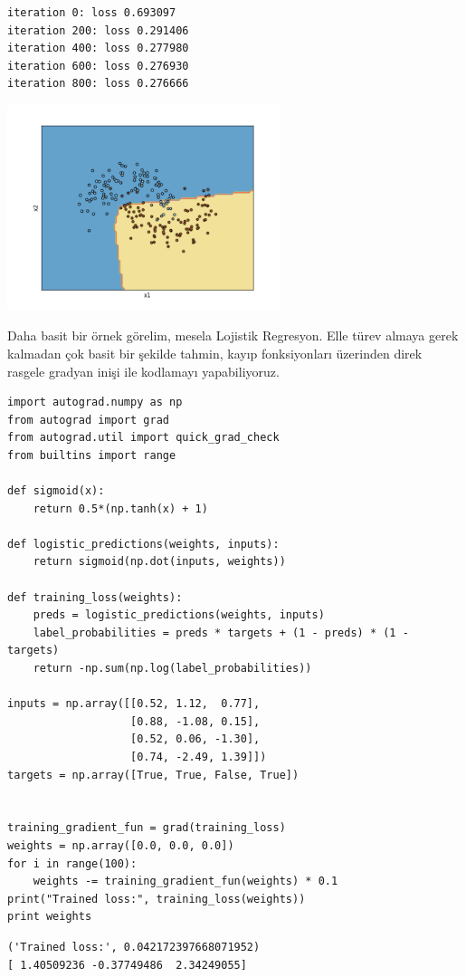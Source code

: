 \documentclass[12pt,fleqn]{article}\usepackage{../../common}
\begin{document}
\begin{verbatim}
iteration 0: loss 0.693097
iteration 200: loss 0.291406
iteration 400: loss 0.277980
iteration 600: loss 0.276930
iteration 800: loss 0.276666
\end{verbatim}

\includegraphics[height=6cm]{autodiff_01.png}

Daha basit bir örnek görelim, mesela Lojistik Regresyon. Elle türev almaya
gerek kalmadan çok basit bir şekilde tahmin, kayıp fonksiyonları üzerinden
direk rasgele gradyan inişi ile kodlamayı yapabiliyoruz.

\begin{verbatim}
import autograd.numpy as np
from autograd import grad
from autograd.util import quick_grad_check
from builtins import range

def sigmoid(x):
    return 0.5*(np.tanh(x) + 1)

def logistic_predictions(weights, inputs):
    return sigmoid(np.dot(inputs, weights))

def training_loss(weights):
    preds = logistic_predictions(weights, inputs)
    label_probabilities = preds * targets + (1 - preds) * (1 - targets)
    return -np.sum(np.log(label_probabilities))

inputs = np.array([[0.52, 1.12,  0.77],
                   [0.88, -1.08, 0.15],
                   [0.52, 0.06, -1.30],
                   [0.74, -2.49, 1.39]])
targets = np.array([True, True, False, True])


training_gradient_fun = grad(training_loss)
weights = np.array([0.0, 0.0, 0.0])
for i in range(100):
    weights -= training_gradient_fun(weights) * 0.1
print("Trained loss:", training_loss(weights))
print weights
\end{verbatim}

\begin{verbatim}
('Trained loss:', 0.042172397668071952)
[ 1.40509236 -0.37749486  2.34249055]
\end{verbatim}
\end{document}
